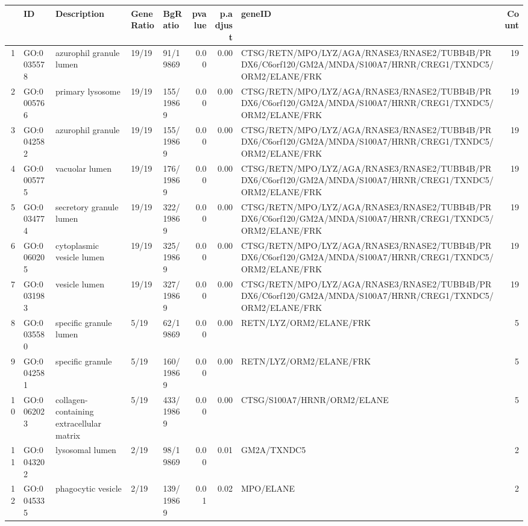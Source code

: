 \begin{table}[ht]
\centering
\begin{tabular}{rllllrrlr}
  \hline
 & ID & Description & GeneRatio & BgRatio & pvalue & p.adjust & geneID & Count \\ 
  \hline
1 & GO:0035578 & azurophil granule lumen & 19/19 & 91/19869 & 0.00 & 0.00 & CTSG/RETN/MPO/LYZ/AGA/RNASE3/RNASE2/TUBB4B/PRDX6/C6orf120/GM2A/MNDA/S100A7/HRNR/CREG1/TXNDC5/ORM2/ELANE/FRK &  19 \\ 
  2 & GO:0005766 & primary lysosome & 19/19 & 155/19869 & 0.00 & 0.00 & CTSG/RETN/MPO/LYZ/AGA/RNASE3/RNASE2/TUBB4B/PRDX6/C6orf120/GM2A/MNDA/S100A7/HRNR/CREG1/TXNDC5/ORM2/ELANE/FRK &  19 \\ 
  3 & GO:0042582 & azurophil granule & 19/19 & 155/19869 & 0.00 & 0.00 & CTSG/RETN/MPO/LYZ/AGA/RNASE3/RNASE2/TUBB4B/PRDX6/C6orf120/GM2A/MNDA/S100A7/HRNR/CREG1/TXNDC5/ORM2/ELANE/FRK &  19 \\ 
  4 & GO:0005775 & vacuolar lumen & 19/19 & 176/19869 & 0.00 & 0.00 & CTSG/RETN/MPO/LYZ/AGA/RNASE3/RNASE2/TUBB4B/PRDX6/C6orf120/GM2A/MNDA/S100A7/HRNR/CREG1/TXNDC5/ORM2/ELANE/FRK &  19 \\ 
  5 & GO:0034774 & secretory granule lumen & 19/19 & 322/19869 & 0.00 & 0.00 & CTSG/RETN/MPO/LYZ/AGA/RNASE3/RNASE2/TUBB4B/PRDX6/C6orf120/GM2A/MNDA/S100A7/HRNR/CREG1/TXNDC5/ORM2/ELANE/FRK &  19 \\ 
  6 & GO:0060205 & cytoplasmic vesicle lumen & 19/19 & 325/19869 & 0.00 & 0.00 & CTSG/RETN/MPO/LYZ/AGA/RNASE3/RNASE2/TUBB4B/PRDX6/C6orf120/GM2A/MNDA/S100A7/HRNR/CREG1/TXNDC5/ORM2/ELANE/FRK &  19 \\ 
  7 & GO:0031983 & vesicle lumen & 19/19 & 327/19869 & 0.00 & 0.00 & CTSG/RETN/MPO/LYZ/AGA/RNASE3/RNASE2/TUBB4B/PRDX6/C6orf120/GM2A/MNDA/S100A7/HRNR/CREG1/TXNDC5/ORM2/ELANE/FRK &  19 \\ 
  8 & GO:0035580 & specific granule lumen & 5/19 & 62/19869 & 0.00 & 0.00 & RETN/LYZ/ORM2/ELANE/FRK &   5 \\ 
  9 & GO:0042581 & specific granule & 5/19 & 160/19869 & 0.00 & 0.00 & RETN/LYZ/ORM2/ELANE/FRK &   5 \\ 
  10 & GO:0062023 & collagen-containing extracellular matrix & 5/19 & 433/19869 & 0.00 & 0.00 & CTSG/S100A7/HRNR/ORM2/ELANE &   5 \\ 
  11 & GO:0043202 & lysosomal lumen & 2/19 & 98/19869 & 0.00 & 0.01 & GM2A/TXNDC5 &   2 \\ 
  12 & GO:0045335 & phagocytic vesicle & 2/19 & 139/19869 & 0.01 & 0.02 & MPO/ELANE &   2 \\ 

\end{tabular}
\end{table}
